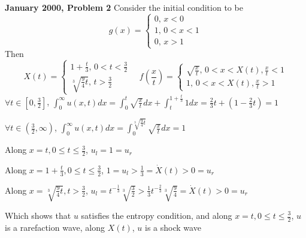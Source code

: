 \documentclass[../main.tex]{subfiles}
\begin{document}
\begin{customproblem}\textbf{January 2000, Problem 2}
Consider the initial condition to be
\[
g(x)=
\left\{
\begin{array}{ll}
0,\,x<0 \\
1,\,0<x<1 \\
0,\,x>1
\end{array}
\right.
\]
Then
\[
X(t)=
\left\{
\begin{array}{ll}
1+\frac{t}{3},\,0<t<\frac{3}{2} \\
\sqrt[3]{\frac{9}{4}t},\,t>\frac{3}{2}
\end{array}
\right.
\quad
f\left(\frac{x}{t}\right)=
\left\{
\begin{array}{ll}
\sqrt{\frac{x}{t}},\,0<x<X(t),\frac{x}{t}<1 \\
1,\,0<x<X(t),\frac{x}{t}>1
\end{array}
\right.
\]
$\forall t\in\left[0,\frac{3}{2}\right]$, $\displaystyle\int_0^\infty u(x,t)dx=\int_0^t\sqrt{\frac{x}{t}}dx+\int_t^{1+\frac{t}{3}}1dx=\frac{2}{3}t+\left(1-\frac{2}{3}t\right)=1$ \par
$\forall t\in\left(\frac{3}{2},\infty\right)$, $\displaystyle\int_0^\infty u(x,t)dx=\int_0^{\sqrt[3]{\frac{9}{4}t}}\sqrt{\frac{x}{t}}dx=1$ \par
Along $x=t,0\leq t\leq\frac{3}{2}$, $u_l=1=u_r$ \par
Along $x=1+\frac{t}{3},0\leq t\leq\frac{3}{2}$, $1=u_l>\frac{1}{3}=\dot{X}(t)>0=u_r$ \par
Along $x=\sqrt[3]{\frac{9}{4}t},  t>\frac{3}{2}$, $u_l=t^{-\frac{1}{3}}\sqrt[3]{\frac{3}{2}}>\frac{1}{3}t^{-\frac{2}{3}}\sqrt[3]{\frac{9}{4}}=\dot{X}(t)>0=u_r$ \par
Which shows that $u$ satisfies the entropy condition, and along $x=t,0\leq t\leq\frac{3}{2}$, $u$ is a rarefaction wave, along $X(t)$, $u$ is a shock wave \par
{}
\begin{center}
\end{center}
\end{customproblem}
\end{document}
